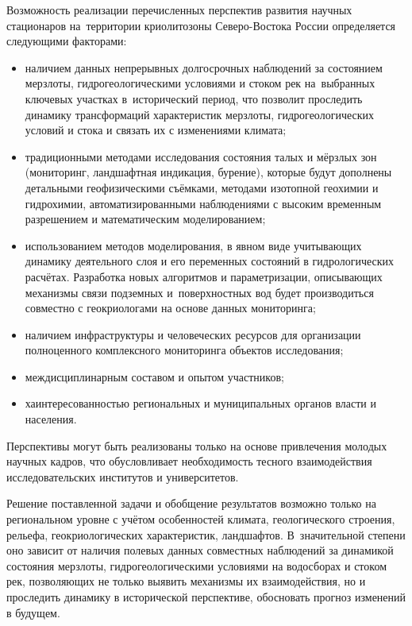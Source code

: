 Возможность реализации перечисленных перспектив развития научных стационаров на~территории криолитозоны Северо-Востока России определяется следующими факторами:
\begin{itemize}[noitemsep]\vspace{-6pt}
\item наличием данных непрерывных долгосрочных наблюдений за состоянием мерзлоты, гидрогеологическими условиями и стоком рек на~выбранных ключевых участках в~исторический период, что позволит проследить динамику трансформаций характеристик мерзлоты, гидрогеологических условий и стока и связать их с изменениями климата;\vspace{2pt}
\item традиционными методами исследования состояния талых и мёрзлых зон (мониторинг, ландшафтная индикация, бурение), которые будут дополнены детальными геофизическими съёмками, методами изотопной геохимии и гидрохимии, автоматизированными наблюдениями с высоким временным разрешением и математическим моделированием;\vspace{2pt}
\item использованием методов моделирования, в явном виде учитывающих динамику деятельного слоя и его переменных состояний в гидрологических расчётах. Разработка новых алгоритмов и параметризации, описывающих механизмы связи подземных и~поверхностных вод будет производиться совместно с геокриологами на основе данных мониторинга;\vspace{2pt}
\item наличием инфраструктуры и человеческих ресурсов для организации полноценного комплексного мониторинга объектов исследования;\vspace{2pt}
\item междисциплинарным составом и опытом участников;\vspace{2pt}
\item хаинтересованностью региональных и муниципальных органов власти и населения.
\end{itemize}
 \vspace{-6pt}

Перспективы могут быть реализованы только на основе привлечения молодых научных кадров, что обусловливает необходимость тесного взаимодействия исследовательских институтов и университетов.

Решение поставленной задачи и обобщение результатов возможно только на региональном уровне с учётом особенностей климата, геологического строения, рельефа, геокриологических характеристик, ландшафтов. В~значительной степени оно зависит от наличия полевых данных совместных наблюдений за динамикой состояния мерзлоты, гидрогеологическими условиями на водосборах и стоком рек, позволяющих не только выявить механизмы их взаимодействия, но и проследить динамику в исторической перспективе, обосновать прогноз изменений в будущем.

